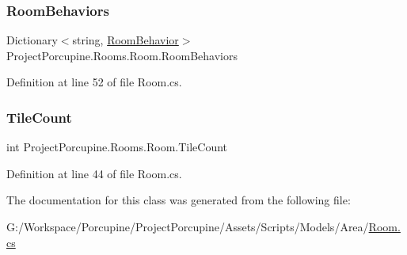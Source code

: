 \subsubsection{\texorpdfstring{Room\+Behaviors}{RoomBehaviors}}
{\footnotesize\ttfamily Dictionary$<$string, \hyperlink{class_project_porcupine_1_1_rooms_1_1_room_behavior}{Room\+Behavior}$>$ Project\+Porcupine.\+Rooms.\+Room.\+Room\+Behaviors\hspace{0.3cm}{\ttfamily [get]}}



Definition at line 52 of file Room.\+cs.

\mbox{\label{class_project_porcupine_1_1_rooms_1_1_room_a4d750b1ce000b76f5bfbc46089477668}} 
\subsubsection{\texorpdfstring{Tile\+Count}{TileCount}}
{\footnotesize\ttfamily int Project\+Porcupine.\+Rooms.\+Room.\+Tile\+Count\hspace{0.3cm}{\ttfamily [get]}}



Definition at line 44 of file Room.\+cs.



The documentation for this class was generated from the following file\+:\begin{DoxyCompactItemize}
\item 
G\+:/\+Workspace/\+Porcupine/\+Project\+Porcupine/\+Assets/\+Scripts/\+Models/\+Area/\hyperlink{_room_8cs}{Room.\+cs}\end{DoxyCompactItemize}
